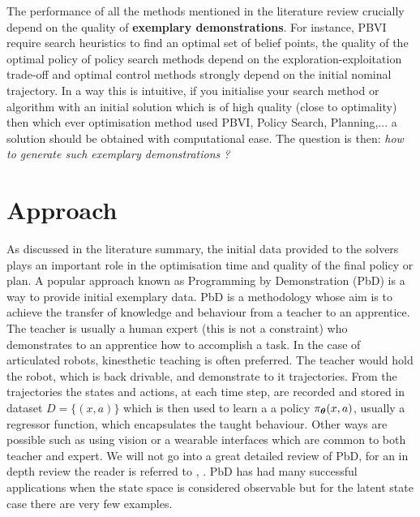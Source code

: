 The performance of all the methods mentioned in the literature review crucially depend on the quality of 
\textbf{exemplary demonstrations}. For instance, PBVI require search heuristics to find an optimal set of belief points, 
the quality of the optimal policy of policy search methods depend on the exploration-exploitation trade-off
and optimal control methods strongly depend on the initial nominal trajectory. In a way this is intuitive, 
if you initialise your search method or algorithm with an initial solution which is of high quality (close to optimality) 
then which ever optimisation method used PBVI, Policy Search, Planning,... a solution should be obtained with 
computational ease. The question is then: \textit{how to generate such exemplary demonstrations ?} 



\section{Approach}\label{sec:approach}

As discussed in the literature summary, the initial data provided to the solvers plays an important role in the optimisation time and
quality of the final policy or plan. A popular approach known as Programming by Demonstration (PbD) is a way to provide initial 
exemplary data. PbD is a methodology whose aim is to achieve the transfer of knowledge and behaviour from a teacher to an apprentice. 
The teacher is usually a human expert (this is not a constraint) who demonstrates to an apprentice how to accomplish a task. In the case of articulated robots, 
kinesthetic teaching is often preferred. The teacher would hold the robot, which is back drivable, and demonstrate to it trajectories. From the 
trajectories the states and actions, at each time step, are recorded and stored in dataset $D=\{(x,a)\}$ which is then used to learn a 
a policy $\operatorname{\pi_{\boldsymbol{\theta}}}(x,a)$, usually a regressor function, which encapsulates the taught behaviour. Other ways are possible such as using vision or a 
wearable interfaces which are common to both teacher and expert. We will not go into a great detailed review of PbD, for an in depth review 
the reader is referred to \cite{Billard08chapter}, \cite{Billard_schol_2013}. PbD has had many successful applications when the state space is considered observable
but for the latent state case there are very few examples. 

